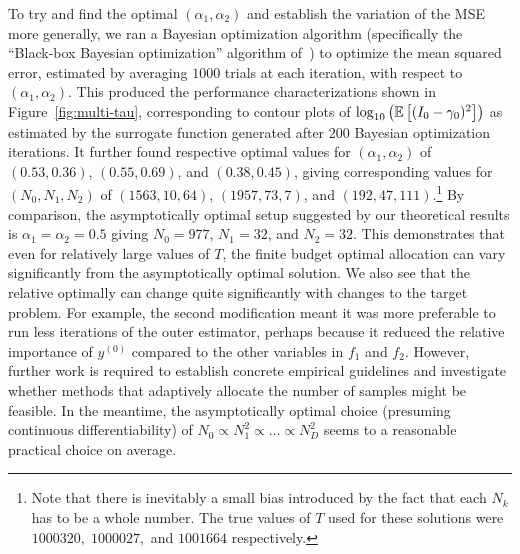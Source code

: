 To 
try and find the optimal $(\alpha_1,\alpha_2)$ and establish the variation of the MSE more generally,
we ran a Bayesian optimization
algorithm (specifically the ``Black-box Bayesian optimization'' algorithm of~\cite{rainforth2015workshopbopp}) to
optimize the mean squared error, estimated by averaging $1000$ trials at each iteration, with respect to 
$(\alpha_1,\alpha_2)$.  This produced the performance characterizations shown in
Figure~\ref{fig:multi-tau}, corresponding to contour plots of $\log_{10} \left(\mathbb{E} \left[(I_0-\gamma_0)^2\right]\right)$ as
estimated by the surrogate function generated after $200$ Bayesian optimization iterations.
It further found respective optimal values for $(\alpha_1,\alpha_2)$ of  $(0.53,0.36)$, $(0.55,0.69)$, and $(0.38,0.45)$,
giving corresponding values for $(N_0,N_1,N_2)$
of $(1563,10,64)$, $(1957,73,7)$, and $(192,47,111)$.\footnote{Note that there is inevitably a small bias introduced
	by the fact that each $N_k$ has to be a whole number.  The true values of $T$ used for these solutions
	were $1000320,\; 1000027,$ and $1001664$ respectively.}  By comparison, the asymptotically optimal
setup suggested by our theoretical results is $\alpha_1=\alpha_2=0.5$ giving $N_0=977$, $N_1=32$, and 
$N_2=32$.
This demonstrates that even for relatively large values of $T$, the finite budget optimal allocation can vary significantly
from the asymptotically optimal solution.  We also see that the relative optimally can change quite significantly with
changes to the target problem.  For example, the second modification meant it was more preferable to run less iterations of
the outer estimator, perhaps because it reduced the relative importance of $y^{(0)}$ compared to the other variables
in $f_1$ and $f_2$.  However, further work is required to
establish concrete empirical guidelines and investigate whether methods that adaptively allocate the number of
samples might be feasible.  In the meantime, the asymptotically optimal choice (presuming continuous differentiability) 
of $N_0 \propto N_1^2 \propto \dots \propto N_D^2$ seems to a reasonable practical choice on average.

